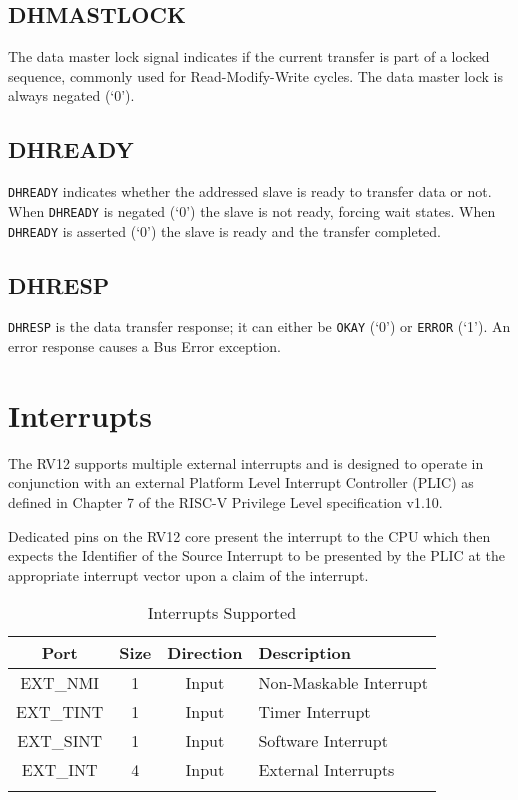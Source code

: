 \subsection{DHMASTLOCK}\label{dhmastlock}

The data master lock signal indicates if the current transfer is part of
a locked sequence, commonly used for Read-Modify-Write cycles. The data
master lock is always negated (`0').

\subsection{DHREADY}\label{dhready}

\texttt{DHREADY} indicates whether the addressed slave is ready to transfer data
or not. When \texttt{DHREADY} is negated (`0') the slave is not ready, forcing
wait states. When \texttt{DHREADY} is asserted (`0') the slave is ready and the
transfer completed.

\subsection{DHRESP}\label{dhresp}

\texttt{DHRESP} is the data transfer response; it can either be \texttt{OKAY} (`0') or
\texttt{ERROR} (`1'). An error response causes a Bus Error exception.

\section{Interrupts}\label{interrupts}

The RV12 supports multiple external interrupts and is designed to
operate in conjunction with an external Platform Level Interrupt
Controller (PLIC) as defined in Chapter 7 of the RISC-V Privilege Level
specification v1.10.

Dedicated pins on the RV12 core present the interrupt to the CPU which
then expects the Identifier of the Source Interrupt to be presented by
the PLIC at the appropriate interrupt vector upon a claim of the
interrupt.

\begin{longtable}[]{@{}cccl@{}}
\toprule
Port & Size & Direction & Description\tabularnewline
\midrule
\endhead
EXT\_NMI  & 1 & Input & Non-Maskable Interrupt\tabularnewline
EXT\_TINT & 1 & Input & Timer Interrupt\tabularnewline
EXT\_SINT & 1 & Input & Software Interrupt\tabularnewline
EXT\_INT  & 4 & Input & External Interrupts\tabularnewline
\bottomrule
\caption{Interrupts Supported}
\label{tab:int-support}
\end{longtable}

